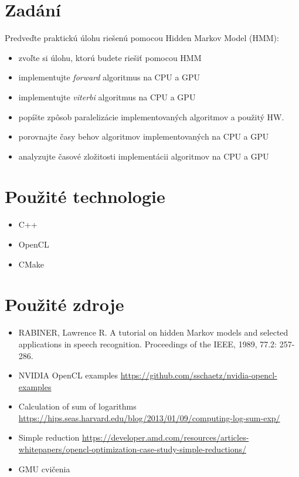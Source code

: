 \documentclass[11pt,a4paper]{article}
\begin{document}
\titlepageandcontents

\section{Zadání}
Predveďte praktickú úlohu riešenú pomocou Hidden Markov Model (HMM):
\begin{itemize}
\item zvoľte si úlohu, ktorú budete riešiť pomocou HMM
\item implementujte \textit{forward} algoritmus na CPU a GPU
\item implementujte \textit{viterbi} algoritmus na CPU a GPU
\item popíšte zpôsob paralelizácie implementovaných algoritmov a použitý HW. 
\item porovnajte časy behov algoritmov implementovaných na CPU a GPU
\item analyzujte časové zložitosti implementácii algoritmov na CPU a GPU
\end{itemize}


\section{Použité technologie}
\begin{itemize}
\item C++
\item OpenCL
\item CMake
\end{itemize}


\section{Použité zdroje}
\begin{itemize}
\item RABINER, Lawrence R. A tutorial on hidden Markov models and selected applications in speech recognition. Proceedings of the IEEE, 1989, 77.2: 257-286.
\item NVIDIA OpenCL examples \url{https://github.com/sschaetz/nvidia-opencl-examples}
\item Calculation of sum of logarithms \url{https://hips.seas.harvard.edu/blog/2013/01/09/computing-log-sum-exp/}
\item Simple reduction \url{https://developer.amd.com/resources/articles-whitepapers/opencl-optimization-case-study-simple-reductions/}
\item GMU cvičenia
\end{itemize}
\end{document}
